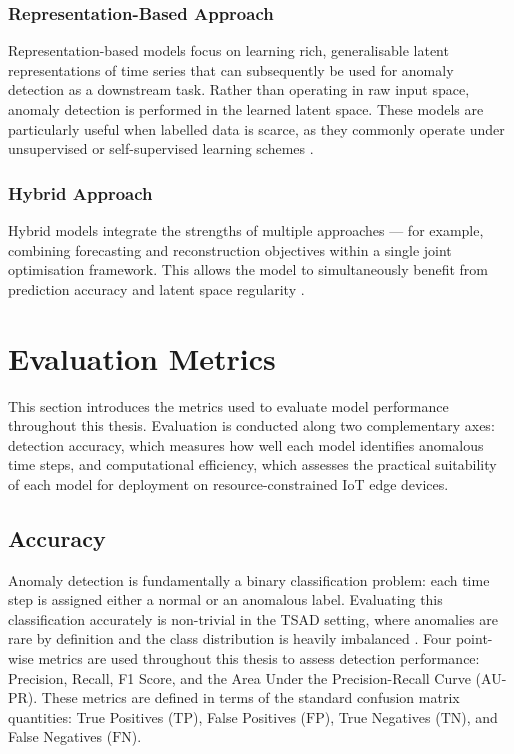 \documentclass[twoside,11pt,openright]{report}
\begin{document}
\subsubsection{Representation-Based Approach}
\label{sec:representation_based}
 
Representation-based models focus on learning rich, generalisable latent representations of time series that can subsequently be used for anomaly detection as a downstream task.
Rather than operating in raw input space, anomaly detection is performed in the learned latent space.
These models are particularly useful when labelled data is scarce, as they commonly operate under unsupervised or self-supervised learning schemes  \citep{darban2024survey}.
 
\subsubsection{Hybrid Approach}
\label{sec:hybrid}
 
Hybrid models integrate the strengths of multiple approaches --- for example, combining forecasting and reconstruction objectives within a single joint optimisation framework.
This allows the model to simultaneously benefit from prediction accuracy and latent space regularity \citep{darban2024survey}.

\section{Evaluation Metrics}
\label{sec:eval_metrics}
This section introduces the metrics used to evaluate model performance throughout 
this thesis. Evaluation is conducted along two complementary axes: detection 
accuracy, which measures how well each model identifies anomalous time steps, and 
computational efficiency, which assesses the practical suitability of each model 
for deployment on resource-constrained IoT edge devices.

\subsection{Accuracy}

Anomaly detection is fundamentally a binary classification problem: each time step is assigned
either a normal or an anomalous label. Evaluating this classification accurately is non-trivial
in the TSAD setting, where anomalies are rare by definition and the class distribution is
heavily imbalanced \cite{darban2024survey}. Four point-wise metrics are used throughout
this thesis to assess detection performance: Precision, Recall, F1 Score, and the Area Under 
the Precision-Recall Curve (AU-PR). These metrics are defined in terms
of the standard confusion matrix quantities: True Positives (\(\mathrm{TP}\)), False Positives
(\(\mathrm{FP}\)), True Negatives (\(\mathrm{TN}\)), and False Negatives (\(\mathrm{FN}\)).
\end{document}
